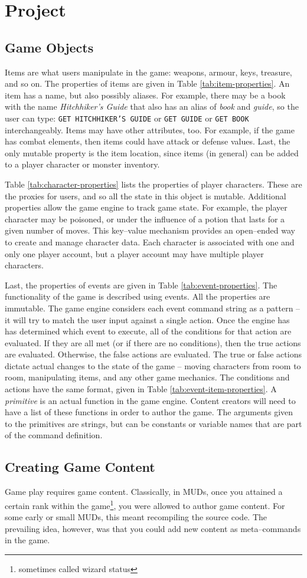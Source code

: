 \documentclass{article}
\newcommand{\enterProblemHeader}[1]{
}
\newcommand{\exitProblemHeader}[1]{
\nobreak\extramarks{#1}{}\nobreak
}
\newcounter{homeworkProblemCounter} %
\newcommand{\homeworkProblemName}{}
\newenvironment{homeworkProblem}[1][Problem \arabic{homeworkProblemCounter}]{ %
\stepcounter{homeworkProblemCounter} %
\renewcommand{\homeworkProblemName}{#1} %
\section{\homeworkProblemName} %
\enterProblemHeader{\homeworkProblemName} %
}{
\exitProblemHeader{\homeworkProblemName} %
}
\newcommand{\homeworkSectionName}{}
\newenvironment{homeworkSection}[1]{ %
\renewcommand{\homeworkSectionName}{#1} %
\subsection{\homeworkSectionName} %
\enterProblemHeader{\homeworkProblemName\ [\homeworkSectionName]} %
}{
\enterProblemHeader{\homeworkProblemName} %
}
\begin{document}
\begin{homeworkProblem}[Project]
\begin{homeworkSection}{Game Objects}
	Items are what users manipulate in the game: weapons, armour, keys, treasure, and so on. The properties of items are given in Table \ref{tab:item-properties}. An item has a name, but also possibly aliases. For example, there may be a book with the name \textit{Hitchhiker's Guide} that also has an alias of \textit{book} and \textit{guide}, so the user can type: \texttt{GET HITCHHIKER'S GUIDE} or \texttt{GET GUIDE} or \texttt{GET BOOK} interchangeably. Items may have other attributes, too. For example, if the game has combat elements, then items could have attack or defense values. Last, the only mutable property is the item location, since items (in general) can be added to a player character or monster inventory.

	Table \ref{tab:character-properties} lists the properties of player characters. These are the proxies for users, and so all the state in this object is mutable. Additional properties allow the game engine to track game state. For example, the player character may be poisoned, or under the influence of a potion that lasts for a given number of moves. This key--value mechanism provides an open--ended way to create and manage character data. Each character is associated with one and only one player account, but a player account may have multiple player characters.

	Last, the properties of events are given in Table \ref{tab:event-properties}. The functionality of the game is described using events. All the properties are immutable. The game engine considers each event command string as a pattern -- it will try to match the user input against a single action. Once the engine has has determined which event to execute, all of the conditions for that action are evaluated. If they are all met (or if there are no conditions), then the true actions are evaluated. Otherwise, the false actions are evaluated. The true or false actions dictate actual changes to the state of the game -- moving characters from room to room, manipulating items, and any other game mechanics. The conditions and actions have the same format, given in Table \ref{tab:event-item-properties}. A \textit{primitive} is an actual function in the game engine. Content creators will need to have a list of these functions in order to author the game. The arguments given to the primitives are strings, but can be constants or variable names that are part of the command definition.
\end{homeworkSection}

\begin{homeworkSection}{Creating Game Content}
	Game play requires game content. Classically, in MUDs, once you attained a certain rank within the game\footnote{sometimes called wizard status}, you were allowed to author game content. For some early or small MUDs, this meant recompiling the source code. The prevailing idea, however, was that you could add new content as meta--commands in the game.


\end{homeworkSection}
\end{homeworkProblem}
\end{document}
